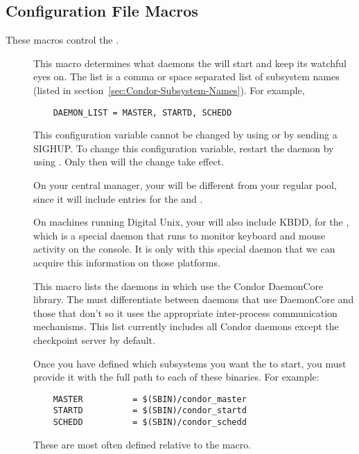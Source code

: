 \subsection{\label{sec:Master-Config-File-Entries} Configuration File Macros} 

These macros control the .
\begin{description}
  
\item[] \label{param:DaemonList} This macro
  determines what daemons the  will start and keep its
  watchful eyes on.  The list is a comma or space separated list of
  subsystem names (listed in
  section~\ref{sec:Condor-Subsystem-Names}).  For example,
  \begin{verbatim}
    DAEMON_LIST = MASTER, STARTD, SCHEDD
  \end{verbatim}

  \Note This configuration variable cannot be changed 
  by using  or 
  by sending a SIGHUP.
  To change this configuration variable, restart the
   daemon
  by using .
  Only then will the change take effect.

  \Note On your central manager, your 
  will be different from your regular pool, since it will include
  entries for the  and .  
  
  \Note On machines running Digital Unix, your
   will also include KBDD, for the
  , which is a special daemon that runs to monitor
  keyboard and mouse activity on the console.  It is only with this
  special daemon that we can acquire this information on those
  platforms. 

\item[] \label{param:DCDaemonList} This macro
  lists the daemons in  which use the Condor
  DaemonCore library.  The  must differentiate between
  daemons that use DaemonCore and those that don't so it uses the
  appropriate inter-process communication mechanisms.  This list
  currently includes all Condor daemons except the checkpoint server
  by default.
  
\item[] \label{param:SUBSYS}
  Once you have defined which
  subsystems you want the  to start, you must provide
  it with the full path to each of these binaries.  For example:
  \begin{verbatim}
    MASTER          = $(SBIN)/condor_master
    STARTD          = $(SBIN)/condor_startd
    SCHEDD          = $(SBIN)/condor_schedd
  \end{verbatim}
  These are most often defined relative to the  macro.


\end{description}
